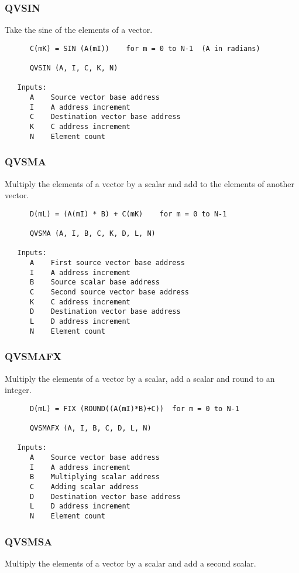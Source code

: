 \subsubsection{QVSIN }
Take the sine of the elements of a vector.

\begin{verbatim}
      C(mK) = SIN (A(mI))    for m = 0 to N-1  (A in radians)

      QVSIN (A, I, C, K, N)

   Inputs:
      A    Source vector base address
      I    A address increment
      C    Destination vector base address
      K    C address increment
      N    Element count

\end{verbatim}
\subsubsection{QVSMA }
Multiply the elements of a vector by a scalar and add to the
elements of another vector.

\begin{verbatim}
      D(mL) = (A(mI) * B) + C(mK)    for m = 0 to N-1

      QVSMA (A, I, B, C, K, D, L, N)

   Inputs:
      A    First source vector base address
      I    A address increment
      B    Source scalar base address
      C    Second source vector base address
      K    C address increment
      D    Destination vector base address
      L    D address increment
      N    Element count

\end{verbatim}
\subsubsection{QVSMAFX }
Multiply the elements of a vector by a scalar, add a scalar and
round to an integer.

\begin{verbatim}
      D(mL) = FIX (ROUND((A(mI)*B)+C))  for m = 0 to N-1

      QVSMAFX (A, I, B, C, D, L, N)

   Inputs:
      A    Source vector base address
      I    A address increment
      B    Multiplying scalar address
      C    Adding scalar address
      D    Destination vector base address
      L    D address increment
      N    Element count

\end{verbatim}
\subsubsection{QVSMSA }
Multiply the elements of a vector by a scalar and add a second scalar.

